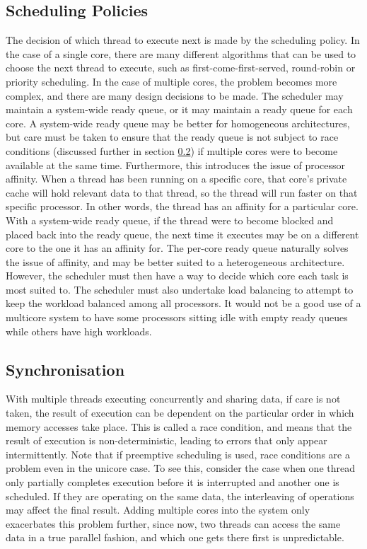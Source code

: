 \documentclass[bsc,frontabs,singlespacing,parskip,deptreport]{infthesis}     %
\begin{document}
\subsection{Scheduling Policies}
\label{scheduling-challenges}
The decision of which thread to execute next is made by the scheduling policy. In the case of a single core, there are many different algorithms that can be used to choose the next thread to execute, such as first-come-first-served, round-robin or priority scheduling. In the case of multiple cores, the problem becomes more complex, and there are many design decisions to be made. The scheduler may maintain a system-wide ready queue, or it may maintain a ready queue for each core. A system-wide ready queue may be better for homogeneous architectures, but care must be taken to ensure that the ready queue is not subject to race conditions (discussed further in section \ref{synchronisation-challenges}) if multiple cores were to become available at the same time. Furthermore, this introduces the issue of processor affinity. When a thread has been running on a specific core, that core’s private cache will hold relevant data to that thread, so the thread will run faster on that specific processor. In other words, the thread has an affinity for a particular core. With a system-wide ready queue, if the thread were to become blocked and placed back into the ready queue, the next time it executes may be on a different core to the one it has an affinity for. The per-core ready queue naturally solves the issue of affinity, and may be better suited to a heterogeneous architecture. However, the scheduler must then have a way to decide which core each task is most suited to. The scheduler must also undertake load balancing to attempt to keep the workload balanced among all processors. It would not be a good use of a multicore system to have some processors sitting idle with empty ready queues while others have high workloads. 

\subsection{Synchronisation} \label{synchronisation-challenges}
With multiple threads executing concurrently and sharing data, if care is not taken, the result of execution can be dependent on the particular order in which memory accesses take place. This is called a race condition, and means that the result of execution is non-deterministic, leading to errors that only appear intermittently. Note that if preemptive scheduling is used, race conditions are a problem even in the unicore case. To see this, consider the case when one thread only partially completes execution before it is interrupted and another one is scheduled. If they are operating on the same data, the interleaving of operations may affect the final result. Adding multiple cores into the system only exacerbates this problem further, since now, two threads can access the same data in a true parallel fashion, and which one gets there first is unpredictable. 
\end{document}
